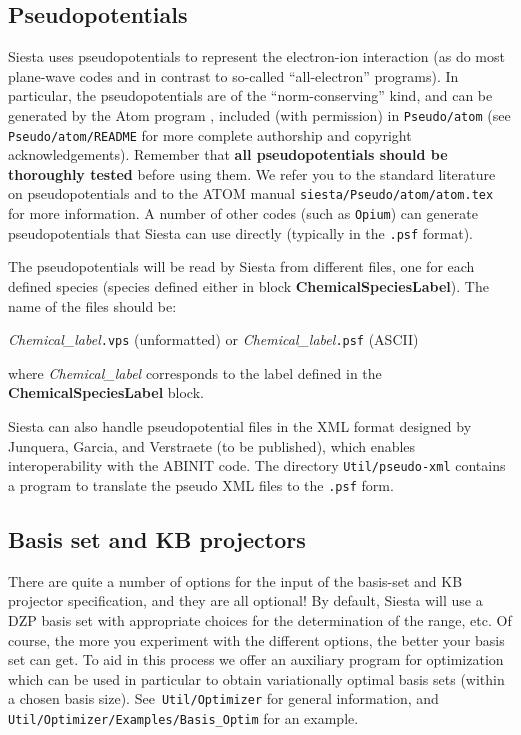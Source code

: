 \documentclass[11pt]{article}
\begin{document}
\vspace{5pt}
\subsection{Pseudopotentials}

{\sc Siesta} uses pseudopotentials to represent the electron-ion
interaction (as do most plane-wave codes and in contrast to so-called
``all-electron'' programs). In particular, the pseudopotentials are of
the ``norm-conserving'' kind, and can be generated by the {\sc Atom} program
, included (with permission) in {\tt Pseudo/atom} (see {\tt
  Pseudo/atom/README} for more complete authorship and
copyright acknowledgements). Remember that {\bf all pseudopotentials
  should be thoroughly tested} before using them. We refer you to the
standard literature on pseudopotentials and to the {\sc ATOM} manual
{\tt siesta/Pseudo/atom/atom.tex} for more information. A number of
other codes (such as {\tt Opium}) can generate pseudopotentials that
{\sc Siesta} can use directly (typically in the {\tt .psf} format).

The pseudopotentials will be read by {\sc Siesta} from different files, one
for each defined species (species defined either in block
{\bf ChemicalSpeciesLabel}).
The name of the files should be:

{\it Chemical\_label}{\tt .vps} (unformatted) or
{\it Chemical\_label}{\tt .psf} (ASCII)

\noindent 
where {\it Chemical\_label} corresponds to the label defined in the
{\bf ChemicalSpeciesLabel} block.
        
Siesta can also handle pseudopotential files in the XML format
designed by Junquera, Garcia, and Verstraete (to be published), which
enables interoperability with the ABINIT code. The directory
{\tt Util/pseudo-xml} contains a program to translate the pseudo
XML files to the {\tt .psf} form.


\vspace{5pt}
\subsection{Basis set and KB projectors} 

\noindent 

There are quite a number of options for the input of the basis-set and
KB projector specification, and they are all optional! By default,
{\sc Siesta} will use a DZP basis set with appropriate choices for the
determination of the range, etc. Of course, the more you experiment
with the different options, the better your basis set can get. To aid
in this process we offer an auxiliary program for optimization which
can be used in particular to obtain variationally optimal basis sets
(within a chosen basis size). See {\tt Util/Optimizer}
for general information, and {\tt Util/Optimizer/Examples/Basis\_Optim}
for an example.
\end{document}
